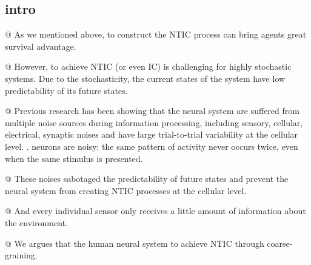 \documentclass[utf8]{article}
\newenvironment{ants}
			{
			 \begin{easylist}[itemize]		
		 	}
			{
			\end{easylist}
			}
\begin{document}
		\subsection{intro}
			\begin{ants}
				@ As we mentioned above, to construct the NTIC process can bring agents great survival advantage.
				
				@ However, to achieve NTIC (or even IC) is challenging for highly stochastic systems. Due to the stochasticity, the current states of the system have low predictability of its future states. 
				
				@ Previous research has been showing that the neural system are suffered from multiple noise sources  during information processing, including sensory, cellular, electrical, synaptic noises and have large trial-to-trial variability at the cellular level. \citep{faisal2008noise}. neurons are noisy: the same pattern of activity never occurs twice, even when the same stimulus is presented.
				
	
				@ These noises sabotaged the predictability of future states and prevent the neural system from creating NTIC processes at the cellular level. 
				
				@ And every individual sensor only receives a little amount of information about the environment.			
				
				@ We argues that the human neural system to achieve NTIC through coarse-graining. 
			\end{ants}
	
	
	
	
	
\end{document}
